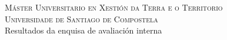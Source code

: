 \documentclass[11pt,a4paper]{article}
\begin{document}
\begin{center}
 \begin{large}
  \textsc{Máster Universitario en Xestión da Terra e o Territorio} \\
  \textsc{Universidade de Santiago de Compostela} \\
  Resultados da enquisa de avaliación interna \\
 \end{large}
\end{center}
\end{document}
